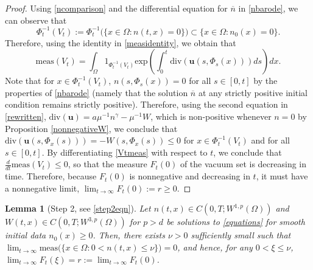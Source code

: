 \documentclass[12pt]{article}
\newcommand{\bd}{\boldsymbol}
\theoremstyle{plain}
\newtheorem{lemma}{Lemma}[section]
\begin{document}
\begin{proof}
Using \eqref{ncomparison} and the differential equation for $\overline{n}$ in \eqref{nbarode}, we can observe that 
\begin{equation*}
\Phi_{t}^{-1}(V_{t}) := \Phi^{-1}_{t}\Big(\{x \in \Omega : n(t, x) = 0\}\Big) \subset \{x \in \Omega : n_{0}(x) = 0\}.
\end{equation*}
Therefore, using the identity in \eqref{measidentity}, we obtain that
\begin{equation}\label{Vtmeas}
\text{meas}(V_{t}) = \int_{\Omega} 1_{\Phi^{-1}_{t}(V_{t})} \text{exp}\left(\int_{0}^{t} \text{div}(\bd{u}(s, \Phi_{s}(x))) ds\right) dx.
\end{equation}
Note that for $x \in \Phi_{t}^{-1}(V_{t})$, $n(s, \Phi_{s}(x)) = 0$ for all $s \in [0, t]$ by the properties of \eqref{nbarode} (namely that the solution $\overline{n}$ at any strictly positive initial condition remains strictly positive). Therefore, using the second equation in \eqref{rewritten}, $\text{div}(\bd{u}) = a\mu^{-1}n^{\gamma} - \mu^{-1}W$, which is non-positive whenever $n = 0$ by Proposition \ref{nonnegativeW}, we conclude that $\text{div}(\bd{u}(s, \Phi_{x}(s))) = -W(s, \Phi_{x}(s)) \le 0$ for $x \in \Phi_{t}^{-1}(V_{t})$ and for all $s \in [0, t]$. By differentiating \eqref{Vtmeas} with respect to $t$, we conclude that $\displaystyle \frac{d}{dt}\text{meas}(V_{t}) \le 0$, so that the measure $F_{t}(0)$ of the vacuum set is decreasing in time. Therefore, because $F_{t}(0)$ is nonnegative and decreasing in $t$, it must have a nonnegative limit, $\lim_{t \to \infty} F_{t}(0) := r \ge 0$.
\end{proof}

\begin{lemma}[Step 2, see \eqref{step2eqn}]\label{step2}
Let $n(t, x) \in C(0, T; W^{1, p}(\Omega))$ and $W(t, x) \in C(0, T; W^{3, p}(\Omega))$ for $p > d$ be solutions to \eqref{equations} for smooth initial data $n_{0}(x) \ge 0$. Then, there exists $\nu > 0$ sufficiently small such that $\lim_{t \to \infty} \text{meas}\Big(\{x \in \Omega : 0 < n(t, x) \le \nu\}\Big) = 0$, and hence, for any $0 < \xi \le \nu$, $\lim_{t \to \infty} F_{t}(\xi) = r := \lim_{t \to \infty} F_{t}(0)$.
\end{lemma}
\end{document}
